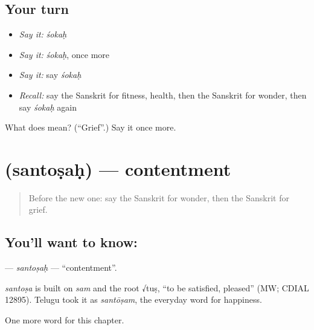 \subsection*{Your turn}
\begin{itemize}
\raggedright
  \item \emph{Say it:} \emph{śokaḥ}
  \item \emph{Say it:} \emph{śokaḥ}, once more
  \item \emph{Say it:} say \emph{śokaḥ}
  \item \emph{Recall:} say the Sanskrit for fitness, health, then the Sanskrit for wonder, then say \emph{śokaḥ} again
\end{itemize}

\begin{tcolorbox}[breakable,colback=teal!4,colframe=teal!35!black,title={Before you move on}]
What does  mean? (\textquotedblleft{}Grief\textquotedblright{}.) Say it once more.
\end{tcolorbox}
\section[\texorpdfstring{\sk{सन्तोषः} (santoṣaḥ)}{सन्तोषः (santoṣaḥ)}]{ (santoṣaḥ) — contentment}

\label{lesson:SA-C182-santosah}



\begin{quote}
Before the new one: say the Sanskrit for wonder, then the Sanskrit for grief.
\end{quote}

\subsection*{You'll want to know: }
\textbf{} — \emph{santoṣaḥ} — \textquotedblleft{}contentment\textquotedblright{}.

\begin{cousinweb}
\emph{santoṣa} is built on \emph{sam} and the root √tuṣ, \textquotedblleft{}to be satisfied, pleased\textquotedblright{} (MW; CDIAL 12895). Telugu took it as \emph{santōṣam}, the everyday word for happiness.
\end{cousinweb}

\begin{grammarlens}[title={What you've built}]
One more word for this chapter.
\end{grammarlens}

